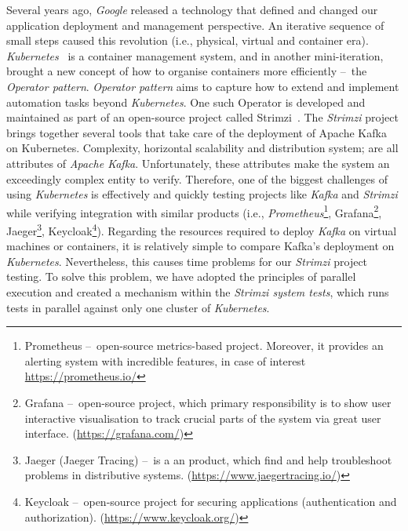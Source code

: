 Several years ago, \emph{Google} released a technology that defined and changed our application deployment and management perspective.
An iterative sequence of small steps caused this revolution (i.e., physical, virtual and container era).
\emph{Kubernetes}~\cite{history, kubernetes, kubernetesBook} is a container management system, and in another mini-iteration, brought a new concept of how to organise containers more efficiently \---\ the \emph{Operator pattern}.
\emph{Operator pattern} aims to capture how to extend and implement automation tasks beyond \emph{Kubernetes}.
One such Operator is developed and maintained as part of an open-source project called Strimzi~\cite{strimziDoc, strimziBlogPosts}.
The \emph{Strimzi} project brings together several tools that take care of the deployment of Apache Kafka~\cite{apacheKafkaDefinitiveGuide, apacheKafkaDesignDistributedSystems, kafkaStreamsBook, kafkaDocumentation} on Kubernetes.
Complexity, horizontal scalability and distribution system;
are all attributes of \emph{Apache Kafka}.
Unfortunately, these attributes make the system an exceedingly complex entity to verify.
Therefore, one of the biggest challenges of using \emph{Kubernetes} is effectively and quickly testing projects like \emph{Kafka} and \emph{Strimzi} while verifying integration with similar products (i.e.,
\emph{Prometheus}\footnote{Prometheus \---\ open-source metrics-based project. Moreover, it provides an alerting system with incredible features, in case of interest \url{https://prometheus.io/}},
Grafana\footnote{Grafana \---\ open-source project, which primary responsibility is to show user interactive visualisation to track crucial parts of the system via great user interface. (\url{https://grafana.com/})},
Jaeger\footnote{Jaeger (Jaeger Tracing) \---\ is a an product, which find and help troubleshoot problems in distributive systems. (\url{https://www.jaegertracing.io/})},
Keycloak\footnote{Keycloak \---\ open-source project for securing applications (authentication and authorization). (\url{https://www.keycloak.org/})}).
Regarding the resources required to deploy \emph{Kafka} on virtual machines or containers, it is relatively simple to compare Kafka's deployment on \emph{Kubernetes}.
Nevertheless, this causes time problems for our \emph{Strimzi} project testing.
To solve this problem, we have adopted the principles of parallel execution and created a mechanism within the \emph{Strimzi system tests}, which runs tests in parallel against only one cluster of \emph{Kubernetes}.

